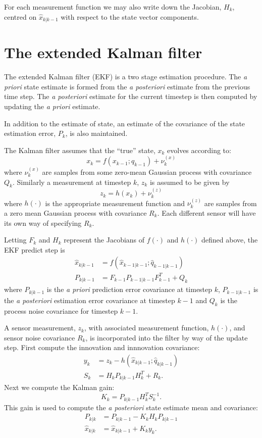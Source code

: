 \documentclass[a4paper]{paper}
\begin{document}
For each measurement function we may also write down the Jacobian, $H_k$,
centred on $\hat{x}_{k|k-1}$ with respect to the state vector components.

\section{The extended Kalman filter}

The extended Kalman filter (EKF) is a two stage estimation procedure. The
\emph{a priori} state estimate is formed from the \emph{a posteriori} estimate
from the previous time step. The \emph{a posteriori} estimate for the current
timestep is then computed by updating the \emph{a priori} estimate.

In addition to the estimate of state, an estimate of the covariance of the state
estimation error, $P_k$, is also maintained.

The Kalman filter assumes that the ``true'' state, $x_k$ evolves according to:
$$
x_k = f(x_{k-1}; q_{k-1}) + \nu^{(x)}_k
$$
where $\nu^{(x)}_k$ are samples from some zero-mean Gaussian process with
covariance $Q_k$. Similarly a measurement at timestep $k$, $z_k$ is assumed to
be given by
$$
z_k = h(x_k) + \nu^{(z)}_k
$$
where $h(\cdot)$ is the appropriate measurement function and $\nu^{(z)}_k$ are
samples from a zero mean Gaussian process with covariance $R_k$. Each different
sensor will have its own way of specifying $R_k$.

Letting $F_k$ and $H_k$ represent the Jacobians of $f(\cdot)$ and $h(\cdot)$
defined above, the EKF predict step is
\begin{align*}
	\hat{x}_{k|k-1} &= f(\hat{x}_{k-1|k-1}; \hat{q}_{k-1|k-1}) \\
	P_{k|k-1} &= F_{k-1} P_{k-1|k-1} F^T_{k-1} + Q_k
\end{align*}
where $P_{k|k-1}$ is the \emph{a priori} prediction error covariance at timestep
$k$, $P_{k-1|k-1}$ is the \emph{a posteriori} estimation error covariance at
timestep $k-1$ and $Q_k$ is the process noise covariance for timestep $k-1$.

A sensor measurement, $z_k$, with associated measurement function, $h(\cdot)$,
and sensor noise covariance $R_k$, is incorporated into the filter by way of the
update step. First compute the innovation and innnovation covariance:
\begin{align*}
	y_k &= z_k - h(\hat{x}_{k|k-1}; \hat{q}_{k|k-1})\\
	S_k &= H_k P_{k|k-1} H^T_k + R_k.
\end{align*}
Next we compute the Kalman gain:
$$ K_k = P_{k|k-1} H^T_k S^{-1}_k. $$
This gain is used to compute the \emph{a posteriori} state estimate mean and covariance:
\begin{align*}
	P_{k|k} &= P_{k|k-1} - K_k H_kP_{k|k-1}\\
	\hat{x}_{k|k} &= \hat{x}_{k|k-1} + K_k y_k.
\end{align*}
\end{document}
